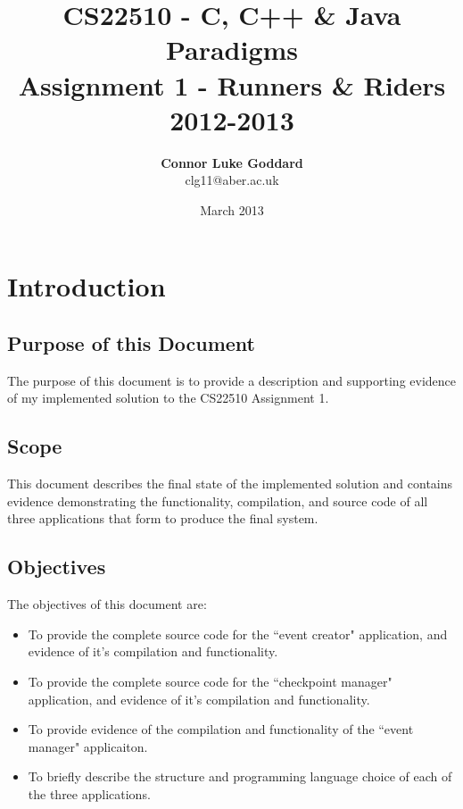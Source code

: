 \documentclass[a4paper, 12pt]{article}
\title{\textbf{CS22510 - C, C++ \& Java Paradigms} \\ Assignment 1 - Runners \& Riders \\ 2012-2013}
\author{\textbf{Connor Luke Goddard}\\clg11@aber.ac.uk}
\date{March 2013}
\begin{document}
\begin{titlepage}
\maketitle
\thispagestyle{empty}
\end{titlepage}

\tableofcontents
\clearpage

\section{Introduction}

\subsection{Purpose of this Document}
The purpose of this document is to provide a description and supporting evidence of my implemented solution to the CS22510 Assignment 1. 

\subsection{Scope}
This document describes the final state of the implemented solution and contains  evidence demonstrating the functionality, compilation, and source code of all three applications that form to produce the final system.

\subsection{Objectives}

The objectives of this document are:

\begin{itemize}

\item To provide the complete source code for the ``event creator" application, and evidence of it's compilation and functionality.
\item To provide the complete source code for the ``checkpoint manager" application, and evidence of it's compilation and functionality.
\item To provide evidence of the compilation and functionality of the ``event manager" applicaiton.
\item To briefly describe the structure and programming language choice of each of the three applications.

\end{itemize}
\end{document}

